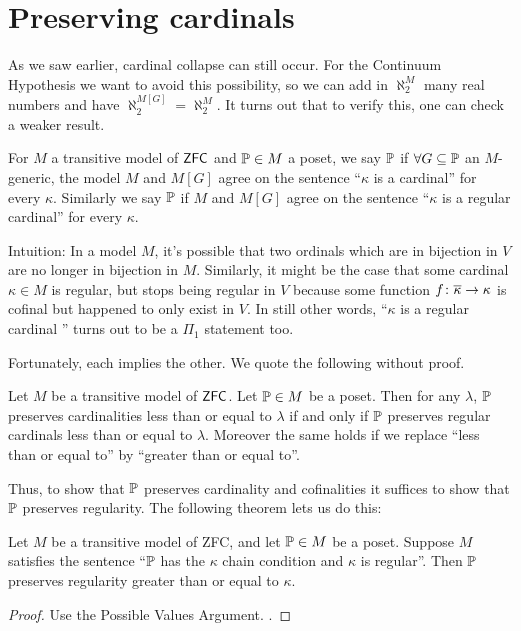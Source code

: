 \section{Preserving cardinals}
As we saw earlier, cardinal collapse can still occur.
For the Continuum Hypothesis we want to avoid this possibility,
so we can add in $\aleph_2^M$ many real numbers and have $\aleph_2^{M[G]} = \aleph_2^M$.
It turns out that to verify this, one can check a weaker result.

\begin{definition}
	For $M$ a transitive model of $\mathsf{ZFC}$ and $\mathbb P \in M$ a poset,
	we say $\mathbb P$  if
	$\forall G \subseteq \mathbb P$ an $M$-generic,
	the model $M$ and $M[G]$ agree on the sentence ``$\kappa$ is a cardinal'' for every $\kappa$.
	Similarly we say $\mathbb P$  if $M$ and $M[G]$
	agree on the sentence ``$\kappa$ is a regular cardinal'' for every $\kappa$.
\end{definition}
Intuition:
In a model $M$, it's possible that two ordinals which are in bijection in $V$ are no longer in bijection in $M$.
Similarly, it might be the case that some cardinal $\kappa \in M$ is regular,
but stops being regular in $V$ because some function $f \colon \overline\kappa \to \kappa$ is cofinal but happened to only exist in $V$.
In still other words, ``$\kappa$ is a regular cardinal '' turns out to be a $\Pi_1$ statement too.

Fortunately, each implies the other.
We quote the following without proof.
\begin{proposition}
	Let $M$ be a transitive model of $\mathsf{ZFC}$.
	Let $\mathbb P \in M$ be a poset.
	Then for any $\lambda$,
		$\mathbb P$ preserves cardinalities less than or equal to $\lambda$
		if and only if $\mathbb P$ preserves regular cardinals less than or equal to $\lambda$.
	Moreover the same holds if we replace ``less than or equal to''
	by ``greater than or equal to''.
\end{proposition}

Thus, to show that $\mathbb P$ preserves cardinality and cofinalities
it suffices to show that $\mathbb P$ preserves regularity.
The following theorem lets us do this:
\begin{theorem}
	Let $M$ be a transitive model of ZFC, and let $\mathbb P \in M$ be a poset.
	Suppose $M$ satisfies the sentence ``$\mathbb P$ has the $\kappa$ chain condition and $\kappa$ is regular''.
	Then $\mathbb P$ preserves regularity greater than or equal to $\kappa$.
\end{theorem}
\begin{proof}
	Use the Possible Values Argument.
	.
\end{proof}

